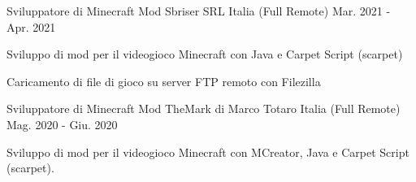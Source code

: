 \begin{cventries}
  \cventry
    {Sviluppatore di Minecraft Mod} %
    {Sbriser SRL}%
    {Italia (Full Remote)} %
    {Mar. 2021 - Apr. 2021} %
    {
      \begin{cvitems} %
        \item {Sviluppo di mod per il videogioco Minecraft con Java e Carpet Script (scarpet)}
        \item {Caricamento di file di gioco su server FTP remoto con Filezilla}
      \end{cvitems}
    }

  \cventry
    {Sviluppatore di Minecraft Mod} %
    {TheMark di Marco Totaro} %
    {Italia (Full Remote)} %
    {Mag. 2020 - Giu. 2020} %
    {
      \begin{cvitems} %
        \item {Sviluppo di mod per il videogioco Minecraft con MCreator, Java e Carpet Script (scarpet).}
      \end{cvitems}
    }
\end{cventries}